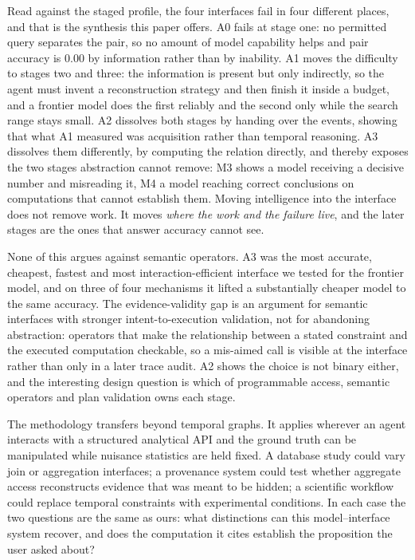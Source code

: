 \documentclass[sigconf,anonymous,review]{acmart}
\begin{document}
Read against the staged profile, the four interfaces fail in four different places, and that is the
synthesis this paper offers. A0 fails at stage one: no permitted query separates the pair, so no
amount of model capability helps and pair accuracy is $0.00$ by information rather than by
inability. A1 moves the difficulty to stages two and three: the information is present but only indirectly, so
the agent must invent a reconstruction strategy and then finish it inside a budget, and a frontier
model does the first reliably and the second only while the search range stays small. A2 dissolves
both stages by handing over the events, showing that what A1 measured was acquisition rather than
temporal reasoning. A3 dissolves them differently, by computing the relation directly, and thereby
exposes the two stages abstraction cannot remove: M3 shows a model receiving a decisive number and
misreading it, M4 a model reaching correct conclusions on computations that cannot establish them.
Moving intelligence into the interface does not remove work. It moves \emph{where the work and the
failure live}, and the later stages are the ones that answer accuracy cannot see.

None of this argues against semantic operators. A3 was the most accurate, cheapest, fastest and
most interaction-efficient interface we tested for the frontier model, and on three of four
mechanisms it lifted a substantially cheaper model to the same accuracy. The evidence-validity gap
is an argument for semantic interfaces with stronger intent-to-execution validation, not for
abandoning abstraction: operators that make the relationship between a stated constraint and the
executed computation checkable, so a mis-aimed call is visible at the interface rather than only in
a later trace audit. A2 shows the choice is not binary either, and the interesting design question
is which of programmable access, semantic operators and plan validation owns each stage.

The methodology transfers beyond temporal graphs. It applies wherever an agent interacts with a
structured analytical API and the ground truth can be manipulated while nuisance statistics are
held fixed. A database study could vary join or aggregation interfaces; a provenance system could
test whether aggregate access reconstructs evidence that was meant to be hidden; a scientific
workflow could replace temporal constraints with experimental conditions. In each case the two
questions are the same as ours: what distinctions can this model--interface system recover, and
does the computation it cites establish the proposition the user asked about?
\end{document}
